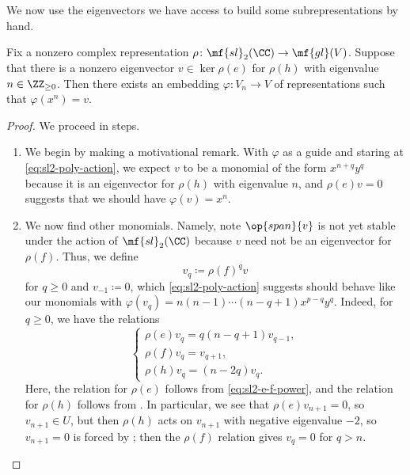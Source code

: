 \documentclass[../notes.tex]{subfiles}
\begin{document}
We now use the eigenvectors we have access to build some subrepresentations by hand.
\begin{lemma} \label{lem:sl2-map-from-sym-power}
	Fix a nonzero complex representation $\rho\colon\mf{sl}_2(\CC)\to\mf{gl}(V)$. Suppose that there is a nonzero eigenvector $v\in\ker\rho(e)$ for $\rho(h)$ with eigenvalue $n\in\ZZ_{\ge0}$. Then there exists an embedding $\varphi\colon V_n\to V$ of representations such that $\varphi\left(x^n\right)=v$.
\end{lemma}
\begin{proof}
	We proceed in steps.
	\begin{enumerate}
		\item %
		We begin by making a motivational remark. With $\varphi$ as a guide and staring at \eqref{eq:sl2-poly-action}, we expect $v$ to be a monomial of the form $x^{n+q}y^q$ because it is an eigenvector for $\rho(h)$ with eigenvalue $n$, and $\rho(e)v=0$ suggests that we should have $\varphi(v)=x^n$.

		\item We now find other monomials. Namely, note $\op{span}\{v\}$ is not yet stable under the action of $\mf{sl}_2(\CC)$ because $v$ need not be an eigenvector for $\rho(f)$. Thus, we define
		\[v_q\coloneqq\rho(f)^qv\]
		for $q\ge0$ and $v_{-1}\coloneqq0$, which \eqref{eq:sl2-poly-action} suggests should behave like our monomials with $\varphi(v_q)=n(n-1)\cdots(n-q+1)x^{p-q}y^q$. Indeed, for $q\ge0$, we have the relations
		\[\begin{cases}
			\rho(e)v_q=q(n-q+1)v_{q-1}, \\
			\rho(f)v_q=v_{q+1}, \\
			\rho(h)v_q=(n-2q)v_q.
		\end{cases}\]
		Here, the relation for $\rho(e)$ follows from \eqref{eq:sl2-e-f-power}, and the relation for $\rho(h)$ follows from . In particular, we see that $\rho(e)v_{n+1}=0$, so $v_{n+1}\in U$, but then $\rho(h)$ acts on $v_{n+1}$ with negative eigenvalue $-2$, so $v_{n+1}=0$ is forced by ; then the $\rho(f)$ relation gives $v_q=0$ for $q>n$.


\end{enumerate}
\end{proof}
\end{document}
